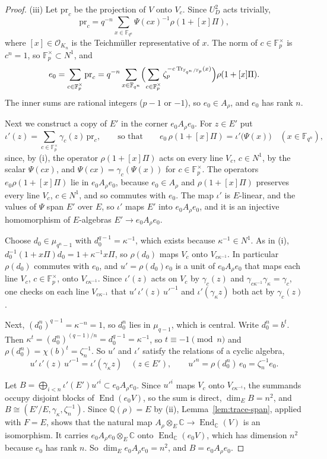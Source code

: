 \documentclass[a4paper,11pt]{amsart}
\theoremstyle{definition}
\theoremstyle{remark}
\numberwithin{equation}{section}
\newcommand{\Q}{\mathbb{Q}}
\DeclareMathOperator{\End}{End}
\DeclareMathOperator{\Tr}{Tr}
\newcommand{\F}{\mathbb{F}}
\newcommand{\C}{\mathbb{C}}
\begin{document}
\begin{proof}
(iii) Let $\mathrm{pr}_c$ be the projection of $V$ onto $V_c$. Since $U_D^2$ acts trivially,
\[
 \mathrm{pr}_c=q^{-n}\sum_{x\in \F_{q^n}}\Psi(cx)^{-1}\rho(1+[x]\Pi),
\]
where $[x]\in\mathcal O_{K_n}$ is the Teichm\"uller representative of $x$. The norm of $c\in\F_p^\times$ is $c^n=1$, so $\F_p^\times\subset N^1$, and
\[
 e_0=\sum_{c\in\F_p^\times}\mathrm{pr}_c=q^{-n}\sum_{x\in \F_{q^n}}\Bigl(\sum_{c\in\F_p^\times} \zeta_p^{-c\Tr_{\F_{q^n}/\F_p}(x)}\Bigr)\rho(1+[x]\Pi).
\]
The inner sums are rational integers ($p-1$ or $-1$), so $e_0\in A_\rho$, and $e_0$ has rank $n$.

Next we construct a copy of $E'$ in the corner $e_0A_\rho e_0$. For $z\in E'$ put
\[
 \iota'(z)=\sum_{c\in\F_p^\times}\gamma_c(z)\,\mathrm{pr}_c,\qquad \text{so that}\qquad e_0\,\rho(1+[x]\Pi)=\iota'\bigl(\Psi(x)\bigr)\quad(x\in\F_{q^n}),
\]
since, by (i), the operator $\rho(1+[x]\Pi)$ acts on every line $V_c$, $c\in N^1$, by the scalar $\Psi(cx)$, and $\Psi(cx)=\gamma_c(\Psi(x))$ for $c\in\F_p^\times$. The operators $e_0\rho(1+[x]\Pi)$ lie in $e_0A_\rho e_0$, because $e_0\in A_\rho$ and $\rho(1+[x]\Pi)$ preserves every line $V_c$, $c\in N^1$, and so commutes with $e_0$. The map $\iota'$ is $E$-linear, and the values of $\Psi$ span $E'$ over $E$, so $\iota'$ maps $E'$ into $e_0A_\rho e_0$, and it is an injective homomorphism of $E$-algebras $E'\to e_0A_\rho e_0$.

Choose $d_0\in\mu_{q^n-1}$ with $d_0^{q-1}=\kappa^{-1}$, which exists because $\kappa^{-1}\in N^1$. As in (i), $d_0^{-1}(1+x\Pi)d_0=1+\kappa^{-1}x\Pi$, so $\rho(d_0)$ maps $V_c$ onto $V_{c\kappa^{-1}}$. In particular $\rho(d_0)$ commutes with $e_0$, and $u'=\rho(d_0)e_0$ is a unit of $e_0A_\rho e_0$ that maps each line $V_c$, $c\in\F_p^\times$, onto $V_{c\kappa^{-1}}$. Since $\iota'(z)$ acts on $V_c$ by $\gamma_c(z)$ and $\gamma_{c\kappa^{-1}}\gamma_\kappa=\gamma_c$, one checks on each line $V_{c\kappa^{-1}}$ that $u'\,\iota'(z)\,u'^{-1}$ and $\iota'(\gamma_\kappa z)$ both act by $\gamma_c(z)$.

Next, $(d_0^n)^{q-1}=\kappa^{-n}=1$, so $d_0^n$ lies in $\mu_{q-1}$, which is central. Write $d_0^n=b^t$. Then $\kappa^t=(d_0^n)^{(q-1)/n}=d_0^{q-1}=\kappa^{-1}$, so $t\equiv-1\pmod n$ and $\rho(d_0^n)=\chi(b)^t=\zeta_n^{-1}$. So $u'$ and $\iota'$ satisfy the relations of a cyclic algebra,
\[
 u'\,\iota'(z)\,u'^{-1}=\iota'(\gamma_\kappa z)\quad(z\in E'),\qquad u'^n=\rho(d_0^n)\,e_0=\zeta_n^{-1}e_0.
\]

Let $B=\bigoplus_{i<n}\iota'(E')u'^i\subset e_0A_\rho e_0$. Since $u'^i$ maps $V_c$ onto $V_{c\kappa^{-i}}$, the summands occupy disjoint blocks of $\End(e_0V)$, so the sum is direct, $\dim_EB=n^2$, and $B\cong(E'/E,\gamma_\kappa,\zeta_n^{-1})$. Since $\Q(\rho)=E$ by (ii), Lemma~\ref{lem:trace-span}, applied with $F=E$, shows that the natural map $A_\rho\otimes_E\C\to\End_\C(V)$ is an isomorphism. It carries $e_0A_\rho e_0\otimes_E\C$ onto $\End_\C(e_0V)$, which has dimension $n^2$ because $e_0$ has rank $n$. So $\dim_Ee_0A_\rho e_0=n^2$, and $B=e_0A_\rho e_0$.


\end{proof}
\end{document}
